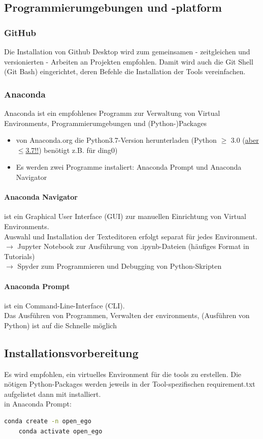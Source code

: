 \documentclass[
a4paper,     %
12pt         %
]{scrartcl}  %
\begin{document}
\subsection{Programmierumgebungen und -platform}
\subsubsection{GitHub}
Die Installation von Github Desktop wird zum gemeinsamen - zeitgleichen und versionierten - Arbeiten an Projekten empfohlen. Damit wird auch die Git Shell (Git Bash) eingerichtet, deren Befehle die Installation der Tools vereinfachen.

\subsubsection{Anaconda}
Anaconda ist ein empfohlenes Programm zur Verwaltung von Virtual Environments, Programmierumgebungen und (Python-)Packages

\begin{itemize}
	\item von Anaconda.org die Python3.7-Version herunterladen (Python $\geq$ 3.0 (\uline{aber $\leq$3.7!!}) benötigt z.B. für ding0)
	\item Es werden zwei Programme instaliert: Anaconda Prompt und Anaconda Navigator
\end{itemize}

\paragraph{Anaconda Navigator} ist ein Graphical User Interface (GUI) zur manuellen Einrichtung von Virtual Environments.\\
		 Auswahl und Installation der Texteditoren erfolgt separat für jedes Environment.\\
		 $\rightarrow$ Jupyter Notebook zur Ausführung von .ipynb-Dateien (häufiges Format in Tutorials)\\
		 $\rightarrow$ Spyder zum Programmieren und Debugging von Python-Skripten

\paragraph{Anaconda Prompt} ist ein Command-Line-Interface (CLI).\\
Das Ausführen von Programmen, Verwalten der environments, (Ausführen von Python) ist auf die Schnelle möglich

\subsection{Installationsvorbereitung}
Es wird empfohlen, ein virtuelles Environment für die tools zu erstellen. Die nötigen Python-Packages werden jeweils in der Tool-spezifischen requirement.txt aufgelistet dann mit installiert.
\\in Anaconda Prompt:
\begin{lstlisting}[language=bash]
	conda create -n open_ego
	conda activate open_ego
\end{lstlisting}
\end{document}
